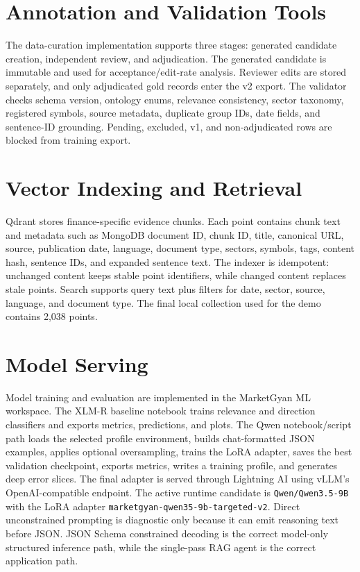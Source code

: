 \documentclass[12pt,a4paper]{report}
\begin{document}
\section{Annotation and Validation Tools}
The data-curation implementation supports three stages: generated candidate creation, independent review, and adjudication. The generated candidate is immutable and used for acceptance/edit-rate analysis. Reviewer edits are stored separately, and only adjudicated gold records enter the v2 export. The validator checks schema version, ontology enums, relevance consistency, sector taxonomy, registered symbols, source metadata, duplicate group IDs, date fields, and sentence-ID grounding. Pending, excluded, v1, and non-adjudicated rows are blocked from training export.

\section{Vector Indexing and Retrieval}
Qdrant stores finance-specific evidence chunks. Each point contains chunk text and metadata such as MongoDB document ID, chunk ID, title, canonical URL, source, publication date, language, document type, sectors, symbols, tags, content hash, sentence IDs, and expanded sentence text. The indexer is idempotent: unchanged content keeps stable point identifiers, while changed content replaces stale points. Search supports query text plus filters for date, sector, source, language, and document type. The final local collection used for the demo contains 2,038 points.

\section{Model Serving}
Model training and evaluation are implemented in the MarketGyan ML workspace. The XLM-R baseline notebook trains relevance and direction classifiers and exports metrics, predictions, and plots. The Qwen notebook/script path loads the selected profile environment, builds chat-formatted JSON examples, applies optional oversampling, trains the LoRA adapter, saves the best validation checkpoint, exports metrics, writes a training profile, and generates deep error slices. The final adapter is served through Lightning AI using vLLM's OpenAI-compatible endpoint. The active runtime candidate is \texttt{Qwen/Qwen3.5-9B} with the LoRA adapter \texttt{marketgyan-qwen35-9b-targeted-v2}. Direct unconstrained prompting is diagnostic only because it can emit reasoning text before JSON. JSON Schema constrained decoding is the correct model-only structured inference path, while the single-pass RAG agent is the correct application path.
\end{document}
